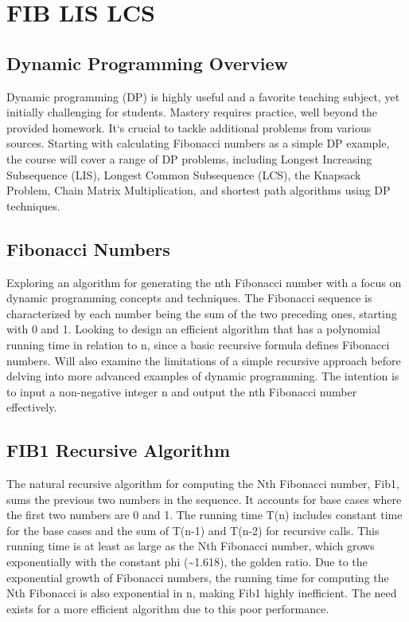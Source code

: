 \section*{FIB    LIS    LCS}

\subsection*{Dynamic Programming Overview}
Dynamic programming (DP) is highly useful and a favorite teaching subject, yet initially challenging for students.
Mastery requires practice, well beyond the provided homework.
It`s crucial to tackle additional problems from various sources.
Starting with calculating Fibonacci numbers as a simple DP example, the course will cover a range of DP problems, including Longest Increasing Subsequence (LIS), Longest Common Subsequence (LCS), the Knapsack Problem, Chain Matrix Multiplication, and shortest path algorithms using DP techniques.

\subsection*{Fibonacci Numbers}
Exploring an algorithm for generating the nth Fibonacci number with a focus on dynamic programming concepts and techniques.
The Fibonacci sequence is characterized by each number being the sum of the two preceding ones, starting with 0 and 1.
Looking to design an efficient algorithm that has a polynomial running time in relation to n, since a basic recursive formula defines Fibonacci numbers.
Will also examine the limitations of a simple recursive approach before delving into more advanced examples of dynamic programming.
The intention is to input a non-negative integer n and output the nth Fibonacci number effectively.

\subsection*{FIB1  Recursive Algorithm}
The natural recursive algorithm for computing the Nth Fibonacci number, Fib1, sums the previous two numbers in the sequence.
It accounts for base cases where the first two numbers are 0 and 1.
The running time T(n) includes constant time for the base cases and the sum of T(n-1) and T(n-2) for recursive calls.
This running time is at least as large as the Nth Fibonacci number, which grows exponentially with the constant phi (\textasciitilde{}1.618), the golden ratio.
Due to the exponential growth of Fibonacci numbers, the running time for computing the Nth Fibonacci is also exponential in n, making Fib1 highly inefficient.
The need exists for a more efficient algorithm due to this poor performance.

